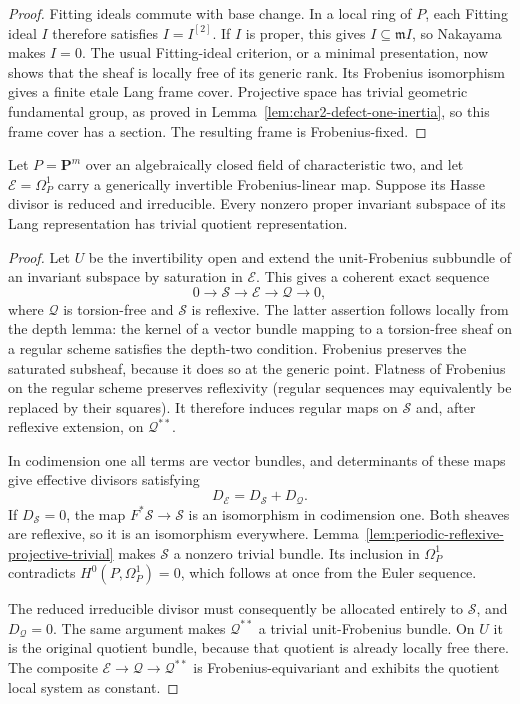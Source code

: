 \begin{proof}
Fitting ideals commute with base change.  In a local ring of $P$,
each Fitting ideal $I$ therefore satisfies $I=I^{[2]}$.
If $I$ is proper, this gives $I\subseteq\mathfrak m I$, so
Nakayama makes $I=0$.  The usual Fitting-ideal criterion, or a
minimal presentation, now shows that the sheaf is locally free
of its generic rank.  Its Frobenius isomorphism gives a finite
etale Lang frame cover.  Projective space has trivial geometric
fundamental group, as proved in
Lemma~\ref{lem:char2-defect-one-inertia}, so this frame cover has
a section.  The resulting frame is Frobenius-fixed.
\end{proof}

\begin{lemma}
\label{lem:irreducible-hasse-quotients-trivial}
Let $P=\mathbf P^m$ over an algebraically closed field of
characteristic two, and let $\mathcal E=\Omega_P^1$ carry a
generically invertible Frobenius-linear map.  Suppose its Hasse
divisor is reduced and irreducible.
Every nonzero proper invariant subspace of its Lang representation
has trivial quotient representation.
\end{lemma}

\begin{proof}
Let $U$ be the invertibility open and extend the unit-Frobenius
subbundle of an invariant subspace by saturation in $\mathcal E$.
This gives a coherent exact sequence
\[
 0\longrightarrow\mathcal S\longrightarrow\mathcal E
       \longrightarrow\mathcal Q\longrightarrow0,
\]
where $\mathcal Q$ is torsion-free and $\mathcal S$ is reflexive.
The latter assertion follows locally from the depth lemma:
the kernel of a vector bundle mapping to a torsion-free sheaf
on a regular scheme satisfies the depth-two condition.
Frobenius preserves the saturated subsheaf, because it does so
at the generic point.  Flatness of Frobenius on the regular
scheme preserves reflexivity (regular sequences may equivalently
be replaced by their squares).  It therefore induces regular
maps on $\mathcal S$ and, after reflexive extension, on
$\mathcal Q^{**}$.

In codimension one all terms are vector bundles, and determinants
of these maps give effective divisors satisfying
\[
                     D_{\mathcal E}=D_{\mathcal S}+D_{\mathcal Q}.
\]
If $D_{\mathcal S}=0$, the map
$F^*\mathcal S\to\mathcal S$ is an isomorphism in codimension
one.  Both sheaves are reflexive, so it is an isomorphism
everywhere.  Lemma~\ref{lem:periodic-reflexive-projective-trivial}
makes $\mathcal S$ a nonzero trivial bundle.  Its inclusion in
$\Omega_P^1$ contradicts $H^0(P,\Omega_P^1)=0$, which follows
at once from the Euler sequence.

The reduced irreducible divisor must consequently be allocated
entirely to $\mathcal S$, and $D_{\mathcal Q}=0$.
The same argument makes $\mathcal Q^{**}$ a trivial unit-Frobenius
bundle.  On $U$ it is the original quotient bundle, because
that quotient is already locally free there.  The composite
$\mathcal E\to\mathcal Q\to\mathcal Q^{**}$ is Frobenius-equivariant
and exhibits the quotient local system as constant.
\end{proof}

